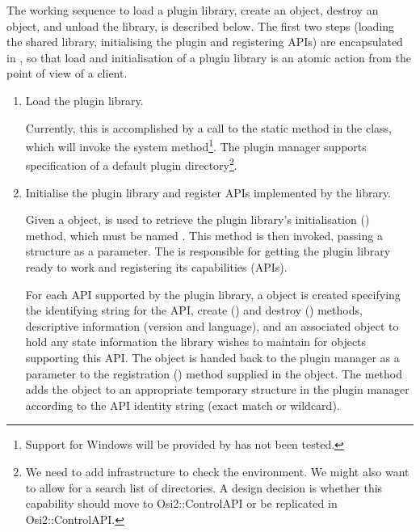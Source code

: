 \documentclass{article}
\newcommand{\OsiTwoControl}{Osi2::ControlAPI\xspace}
\begin{document}
The working sequence to load a plugin library, create an object, destroy an
object, and unload the library, is described below.
The first two steps (loading the shared library, initialising the plugin and
registering APIs) are encapsulated in , so
that load and initialisation of a plugin library is an atomic action from the
point of view of a client.
\begin{enumerate}
  \item
  Load the plugin library.

  Currently, this is accomplished by a call to the static 
  method in the  class, which will invoke the system
   method\footnote{%
      Support for Windows will be provided by has not been tested.}.
  The plugin manager supports specification of a default plugin
  directory\footnote{%
    We need to add infrastructure to check the environment. We might also
    want to allow for a search list of directories.
    A design decision is whether this capability should move to
    \OsiTwoControl or be replicated in \OsiTwoControl.}.

  \item
  Initialise the plugin library and register APIs implemented by the library.

  Given a  object,  is used to
  retrieve the plugin library's initialisation () method,
  which must be named .
  This method is then invoked,
  passing a  structure as a parameter.
  The  is responsible
  for getting the plugin library ready to work and registering
  its capabilities (APIs).

  For each API supported by the plugin library, a  object
  is created specifying the identifying string for the API, create
  () and destroy () methods,
  descriptive information (version and language), and an associated
  object to hold any state information the library wishes to maintain for
  objects supporting this API.
  The  object is handed back to the plugin manager
  as a parameter to the registration () method
  supplied in the  object.
  The  method adds the  object to
  an appropriate temporary structure in the plugin manager
  according to the API identity string (exact match or wildcard).


\end{enumerate}
\end{document}
